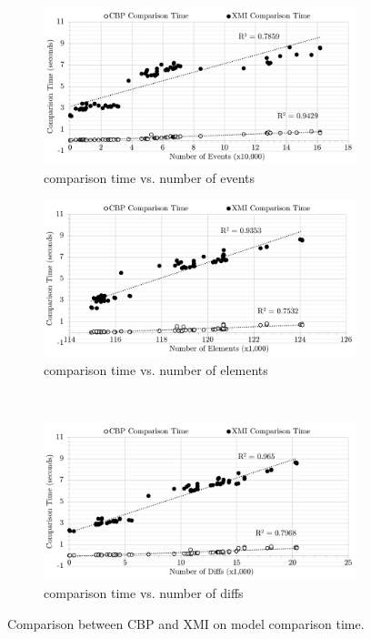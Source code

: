\documentclass{llncs}
\begin{document}
\begin{figure}
\hfill
\centering    
\begin{subfigure}{\linewidth}
    \centering
    \includegraphics[width=\linewidth]{images/Time-Events}
    \caption{comparison time vs. number of events}
    \label{fig:time_events}
\end{subfigure}
\hfill
\centering    
\begin{subfigure}{\linewidth}
    \centering
    \includegraphics[width=\linewidth]{images/Time-Elements}
    \caption{comparison time vs. number of elements}
    \label{fig:time_elements}
\end{subfigure}
\\
\hfill
\centering    
\begin{subfigure}{\linewidth}
    \centering
    \includegraphics[width=\linewidth]{images/Time-Diffs}
    \caption{comparison time vs. number of diffs}
    \label{fig:time_diffs}
\end{subfigure}
\hfill
\label{fig:perfomance_evaluation}
\caption{Comparison between CBP and XMI on model comparison time.}
\end{figure}
\end{document}
